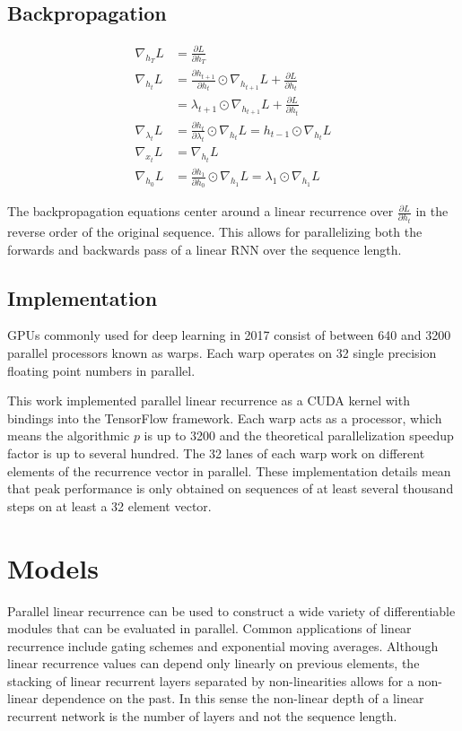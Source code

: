 \documentclass{article}
\begin{document}
\subsection{Backpropagation}
\begin{align*}
\nabla_{h_T}L &= \frac{\partial L}{\partial h_T} \\
\nabla_{h_t}L &= \frac{\partial h_{t+1}}{\partial h_t} \odot \nabla_{h_{t+1}} L + \frac{\partial L}{\partial h_t} \\
&= \lambda_{t+1} \odot \nabla_{h_{t+1}} L + \frac{\partial L}{\partial h_t} \\
\nabla_{\lambda_t}L &= \frac{\partial h_t}{\partial\lambda_t} \odot \nabla_{h_t}L = h_{t-1} \odot \nabla_{h_t}L \\
\nabla_{x_t}L &= \nabla_{h_t} L \\
\nabla_{h_0}L &=  \frac{\partial h_1}{\partial h_0} \odot \nabla_{h_1} L = \lambda_1 \odot \nabla_{h_1} L
\end{align*}

The backpropagation equations center around a linear recurrence over $\frac{\partial L}{\partial h_t}$ in the reverse order of the original sequence. This allows for parallelizing both the forwards and backwards pass of a linear RNN over the sequence length.

\subsection{Implementation}
GPUs commonly used for deep learning in 2017 consist of between 640 and 3200 parallel
processors known as warps. Each warp operates on 32 single precision floating
point numbers in parallel.

This work implemented parallel linear recurrence as a CUDA kernel with bindings
into the TensorFlow \citep{abadi2016tensorflow} framework. Each warp acts as a
processor, which means the algorithmic $p$ is up to 3200 and the theoretical
parallelization speedup factor is up to several hundred.  The 32 lanes of each
warp work on different elements of the recurrence vector in parallel. These
implementation details mean that peak performance is only obtained on sequences
of at least several thousand steps on at least a 32 element vector.

\section{Models}
Parallel linear recurrence can be used to construct a wide variety of differentiable modules that can be evaluated in parallel. Common applications of linear recurrence include gating schemes and exponential moving averages. Although linear recurrence values can depend only linearly on previous elements, the stacking of linear recurrent layers separated by non-linearities allows for a non-linear dependence on the past. In this sense the non-linear depth of a linear recurrent network is the number of layers and not the sequence length.
\end{document}
